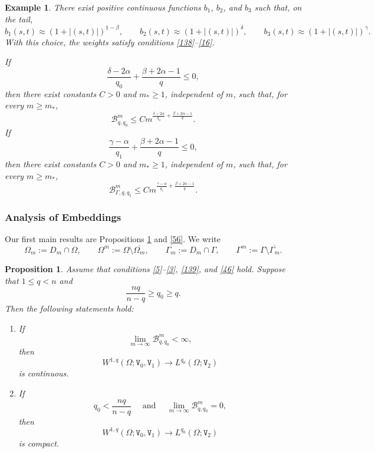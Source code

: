 \documentclass[reqno, 11pt, a4paper]{amsart}
\newtheorem{proposition}[theorem]{Proposition}
\newtheorem{example}[theorem]{Example}
\numberwithin{equation}{section}
\newcommand{\wghtv}{\mathtt{V}}
\newcommand{\qxp}{q}
\newcommand{\qxpz}{q_0}
\newcommand{\qxpo}{q_1}
\newcommand{\Bint}{\mathcal{B}_{\qxp,\qxpz}^{m}}
\newcommand{\Bbd}{\mathcal{B}_{\Gamma,\qxp,\qxpo}^{m}}
\begin{document}
\begin{example}
There exist positive continuous functions $b_1$, $b_2$, and $b_3$ such that, on the tail,
\[
b_1(s,t)\approx (1+|(s,t)|)^{1-\beta},
\qquad
b_2(s,t)\approx(1+|(s,t)|)^{\delta},
\qquad
b_3(s,t)\approx(1+|(s,t)|)^{\gamma}.
\]
With this choice, the weights  satisfy conditions \ref{138}--\ref{16}.

If
\[
 \frac{\delta-2\alpha}{\qxpz}
 +
 \frac{\beta+2\alpha-1}{\qxp}
 \leq0,
\]
then there exist constants \(C>0\) and \(m_\ast\geq1\), independent of
\(m\), such that, for every \(m\geq m_\ast\),
\[
 \Bint
 \leq
 C
 m^{
 \frac{\delta-2\alpha}{\qxpz}
 +
 \frac{\beta+2\alpha-1}{\qxp}
 }.
\]
If
\[
 \frac{\gamma-\alpha}{\qxpo}
 +
 \frac{\beta+2\alpha-1}{\qxp}
 \leq0,
\]
then there exist constants \(C>0\) and \(m_\ast\geq1\), independent of
\(m\), such that, for every \(m\geq m_\ast\),
\[
 \Bbd
 \leq
 C
 m^{
 \frac{\gamma-\alpha}{\qxpo}
 +
 \frac{\beta+2\alpha-1}{\qxp}
 }.
\]

\end{example}



\subsubsection{{Analysis of Embeddings}} Our first main results are Propositions \ref{33} and \ref{56}. We write
\[
\Omega_m:=D_m\cap\Omega,
\qquad
\Omega^m:=\Omega\setminus\overline{\Omega_m},
\qquad
\Gamma_m:=D_m\cap\Gamma,
\qquad
\Gamma^m:=\Gamma\setminus\overline{\Gamma_m}.
\]
\begin{proposition} \label{33}
Assume that conditions \ref{5}--\ref{3}, \ref{139},  and \ref{46} hold. Suppose that \(1\leq\qxp<n\) and
$$
\frac{n\qxp }{ n - \qxp } \geq \qxp _0 \geq \qxp.
$$
Then the following statements hold:
\begin{enumerate}[label=(\roman*)]

\item If 
$$
\lim _{m \rightarrow \infty} \mathcal{B} _{ \qxp , \qxp _0 } ^m  <\infty,
$$
then 
$$
W^{1, \qxp  }(\Omega ;  \wghtv _0, \wghtv _1 ) \rightarrow L^{ \qxp _0 }  ( \Omega ; \wghtv _2 )$$ 
is continuous.

\item If  
$$
\qxp _0<\frac{n\qxp}{n-\qxp} \quad \text { and } \quad \lim _{m \rightarrow \infty} \mathcal{B} _{ \qxp , \qxp _0 } ^m =0,
$$ 
then 
$$
W^{1, \qxp  } (\Omega ; \wghtv _0,  \wghtv _1 ) \rightarrow L^{ \qxp _0 }  ( \Omega ; \wghtv _2  )$$
 is compact.
\end{enumerate}
\end{proposition}
\end{document}
